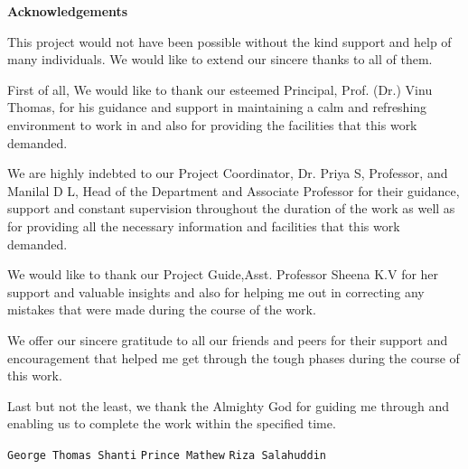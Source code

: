 \documentclass[11pt]{report}
\begin{document}
\begin{titlepage}
\vspace{.25in}	
\begin{center}
\textbf{Acknowledgements}\\
\end{center}
\normalsize

This project would not have been possible without the kind support and help of many individuals. We would like to extend our sincere thanks to all of them.
  
First of all, We would like to thank our esteemed Principal, Prof. (Dr.) Vinu Thomas, for his guidance and support in maintaining a calm and refreshing environment to work in and also for providing the facilities that this work demanded.
  
We are highly indebted to our Project Coordinator, Dr. Priya S, Professor, and Manilal D L, Head of the Department and Associate Professor for their guidance, support and constant supervision throughout the duration of the work as well as for providing all the necessary information and facilities that this work demanded.

We would like to thank our Project Guide,Asst. Professor Sheena K.V for her support and valuable insights and also for helping me out in correcting any mistakes that were made during the course of the work. 
  
We offer our sincere gratitude to all our friends and peers for their support and encouragement that helped me get through the tough phases during the course of this work.
  
Last but not the least, we thank the Almighty God for guiding me through and enabling us to complete the work within the specified time.
\vspace{.25in}

\vspace{.25in}


\flushleft \small{\texttt{George Thomas Shanti}}
\flushleft \small{\texttt{Prince Mathew}}
\flushleft \small{\texttt{Riza Salahuddin}}

\end{titlepage}
\end{document}
